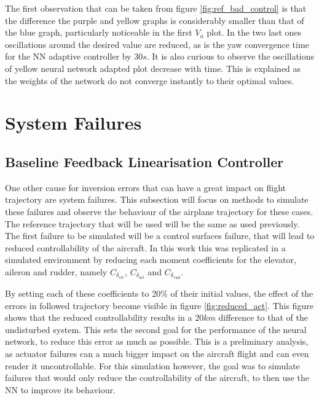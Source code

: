 The first observation that can be taken from figure \ref{fig:ref_bad_control} is that the difference the purple and yellow graphs is considerably smaller than that of the blue graph, particularly noticeable in the first $V_a$ plot. In the two last ones oscillations around the desired value are reduced, as is the yaw convergence time for the NN adaptive controller by $30s$.
It is also curious to observe the oscillations of yellow neural network adapted plot decrease with time. This is explained as the weights of the network do not converge instantly to their optimal values.

\section{System Failures}
\label{section:results/system_failures}

\subsection{Baseline Feedback Linearisation Controller}
One other cause for inversion errors that can have a great impact on flight trajectory are system failures. This subsection will focus on methods to simulate these failures and observe the behaviour of the airplane trajectory for these cases. The reference trajectory that will be used will be the same as used previously. The first failure to be simulated will be a control surfaces failure, that will lead to reduced controllability of the aircraft. In this work this was replicated in a simulated environment by reducing each moment coefficients for the elevator, aileron and rudder, namely $C_{\delta_{ele}}$, $C_{\delta_{ail}}$ and $C_{\delta_{rud}}$.

By setting each of these coefficients to 20\% of their initial values, the effect of the errors in followed trajectory become visible in figure \ref{fig:reduced_act}. This figure shows that the reduced controllability results in a $20km$ difference to that of the undisturbed system. This sets the second goal for the performance of the neural network, to reduce this error as much as possible. This is a preliminary analysis, as actuator failures can a much bigger impact on the aircraft flight and can even render it uncontrollable. For this simulation however, the goal was to simulate failures that would only reduce the controllability of the aircraft, to then use the NN to improve its behaviour. 

